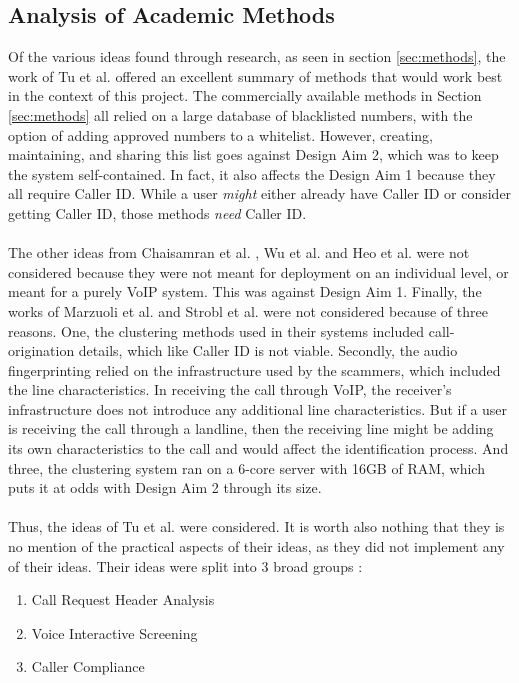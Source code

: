 \documentclass[main.tex]{subfiles}
\begin{document}
\subsection{Analysis of Academic Methods}
Of the various ideas found through research, as seen in section \ref{sec:methods}, the work of Tu et al. \cite{cisco} offered an excellent summary of methods that would work best in the context of this project. The commercially available methods in Section \ref{sec:methods} all relied on a large database of blacklisted numbers, with the option of adding approved numbers to a whitelist. However, creating, maintaining, and sharing this list goes against Design Aim 2, which was to keep the system self-contained. In fact, it also affects the Design Aim 1 because they all require Caller ID. While a user \textit{might} either already have Caller ID or consider getting Caller ID, those methods \textit{need} Caller ID.
\\\\
The other ideas from Chaisamran et al. \cite{chaisa}, Wu et al. \cite{wu} and Heo et al. \cite{heo} were not considered because they were not meant for deployment on an individual level, or meant for a purely VoIP system. This was against Design Aim 1. Finally, the works of Marzuoli et al. \cite{marzuoli} and Strobl et al. \cite{strobl} were not considered because of three reasons. One, the clustering methods used in their systems included call-origination details, which like Caller ID is not viable. Secondly, the audio fingerprinting relied on the infrastructure used by the scammers, which included the line characteristics. In receiving the call through VoIP, the receiver's infrastructure does not introduce any additional line characteristics. But if a user is receiving the call through a landline, then the receiving line might be adding its own characteristics to the call and would affect the identification process. And three, the clustering system ran on a 6-core server with 16GB of RAM, which puts it at odds with Design Aim 2 through its size.
\\\\
Thus, the ideas of Tu et al. \cite{cisco} were considered. It is worth also nothing that they is no mention of the practical aspects of their ideas, as they did not implement any of their ideas. Their ideas were split into 3 broad groups \cite{cisco}:

\begin{enumerate}
	\item Call Request Header Analysis
	\item Voice Interactive Screening
	\item Caller Compliance
\end{enumerate}
\end{document}
